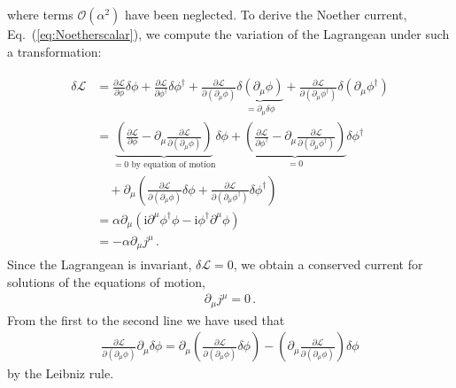 \documentclass[12pt]{report}
\renewcommand{\L}{\ensuremath{\mathscr{L}}}
\renewcommand{\i}{\ensuremath{\text{i}}}
\newcommand{\2}{\ensuremath{\sqrt{2}\,}}
\renewcommand{\L}{\ensuremath{\mathscr{L}}}
\begin{document}
{      where terms $\mathcal{O}\left(\alpha^2\right)$ have been neglected.
      To derive the Noether current, Eq.~(\ref{eq:Noetherscalar}), we
      compute the variation of the Lagrangean under such a transformation:
      
      \begin{align}\label{eq:derivation}
        \begin{split}
          \delta\L &= \frac{\partial \L}{\partial \phi}\delta \phi + \frac{\partial \L}{\partial
            \phi^\dagger}\delta \phi^\dagger +\frac{\partial \L}{\partial \left(\partial_\mu
              \phi\right)} \underbrace{\delta \left(\partial_\mu \phi\right)}_{=\partial_\mu
            \delta\phi} +\frac{\partial \L}{\partial \left(\partial_\mu \phi^\dagger\right)
          }\delta  \left(\partial_\mu \phi^\dagger\right)\\ 
          &= \underbrace{\left(\frac{\partial \L}{\partial \phi}- \partial_\mu \frac{\partial \L}{\partial
                \left(\partial_\mu \phi\right)}\right)}_{=0\text{ by equation of motion}} \delta
          \phi + \underbrace{\left(\frac{\partial \L}{\partial \phi^\dagger}- \partial_\mu
              \frac{\partial \L}{\partial \left(\partial_\mu \phi^\dagger\right)}\right)}_{=0}
          \delta \phi^\dagger\\ 
          &\quad + \partial_\mu \left(
            \frac{\partial \L}{\partial \left(\partial_\mu \phi\right)} \delta\phi
            +\frac{\partial \L}{\partial \left(\partial_\mu \phi^\dagger\right)}
            \delta\phi^\dagger\right)\\
          &= \alpha \partial_\mu\left(\i \partial^\mu \phi^\dagger \phi -\i
            \phi^\dagger\partial^\mu \phi\right)\\
          &=-\alpha \partial_\mu j^\mu \,.
        \end{split}
      \end{align}
      Since the Lagrangean is invariant, $\delta\L = 0$, we obtain a conserved current for 
      solutions of the equations of motion,
      \begin{align}    
        \partial_\mu j^\mu =0\,.
      \end{align}  
      From the first to the second line we have used that
      \begin{align}
        \frac{\partial \L}{\partial \left(\partial_\mu \phi\right)} \partial_\mu \delta \phi =
        \partial_\mu\left(\frac{\partial \L}{\partial \left(\partial_\mu \phi\right)} \delta
          \phi\right)  - \left(\partial_\mu \frac{\partial \L}{\partial \left(\partial_\mu \phi\right)}\right)
        \delta \phi           
      \end{align}
      by the Leibniz rule. 

}
\end{document}
